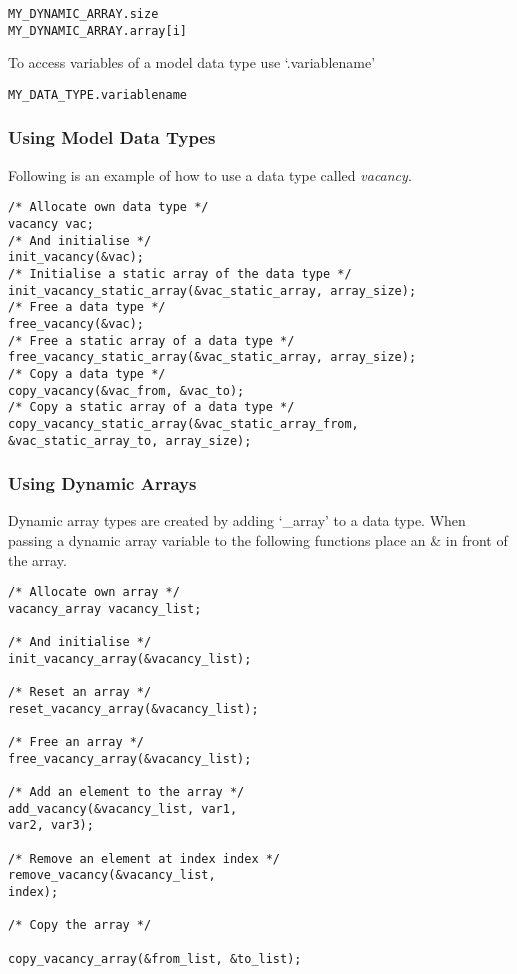 \begin{mylisting}
\begin{verbatim}
MY_DYNAMIC_ARRAY.size
MY_DYNAMIC_ARRAY.array[i]
\end{verbatim}
\end{mylisting}

To access variables of a model data type use `.variablename'

\begin{mylisting}
\begin{verbatim}
MY_DATA_TYPE.variablename
\end{verbatim}
\end{mylisting}

\subsubsection{Using Model Data Types}

Following is an example of how to use a data type called
\emph{vacancy}.

\begin{mylisting}
\begin{verbatim}
/* Allocate own data type */
vacancy vac;
/* And initialise */
init_vacancy(&vac);
/* Initialise a static array of the data type */
init_vacancy_static_array(&vac_static_array, array_size);
/* Free a data type */
free_vacancy(&vac);
/* Free a static array of a data type */
free_vacancy_static_array(&vac_static_array, array_size);
/* Copy a data type */
copy_vacancy(&vac_from, &vac_to);
/* Copy a static array of a data type */
copy_vacancy_static_array(&vac_static_array_from, &vac_static_array_to, array_size);
\end{verbatim}
\end{mylisting}


\subsubsection{Using Dynamic Arrays}

Dynamic array types are created by adding `\_array' to a data type.
When passing a dynamic array variable to the following functions
place an \& in front of the array.

\begin{mylisting}
\begin{verbatim}
/* Allocate own array */
vacancy_array vacancy_list;

/* And initialise */
init_vacancy_array(&vacancy_list);

/* Reset an array */
reset_vacancy_array(&vacancy_list);

/* Free an array */
free_vacancy_array(&vacancy_list);

/* Add an element to the array */
add_vacancy(&vacancy_list, var1,
var2, var3);

/* Remove an element at index index */
remove_vacancy(&vacancy_list,
index);

/* Copy the array */

copy_vacancy_array(&from_list, &to_list);
\end{verbatim}
\end{mylisting}

